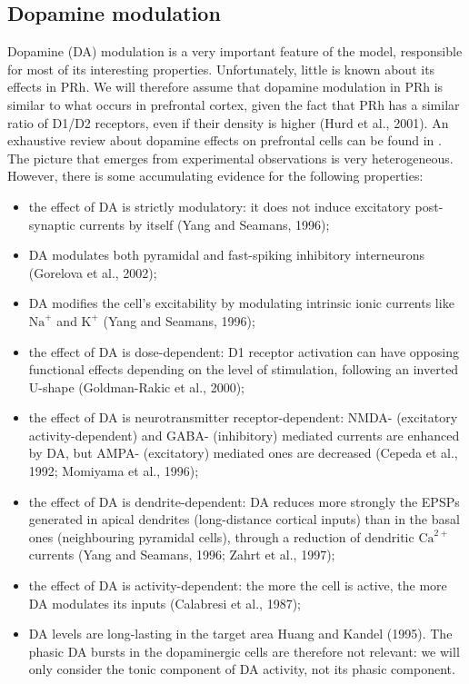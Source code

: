 \documentclass[
  11pt,
  a4paper,
]{scrbook}
\providecommand{\tightlist}{%
  \setlength{\itemsep}{0pt}\setlength{\parskip}{0pt}}\usepackage{longtable,booktabs,array}
\begin{document}
\subsection{Dopamine modulation}\label{dopamine-modulation}

Dopamine (DA) modulation is a very important feature of the model,
responsible for most of its interesting properties. Unfortunately,
little is known about its effects in PRh. We will therefore assume that
dopamine modulation in PRh is similar to what occurs in prefrontal
cortex, given the fact that PRh has a similar ratio of D1/D2 receptors,
even if their density is higher (Hurd et al., 2001). An exhaustive
review about dopamine effects on prefrontal cells can be found in . The
picture that emerges from experimental observations is very
heterogeneous. However, there is some accumulating evidence for the
following properties:

\begin{itemize}
\tightlist
\item
  the effect of DA is strictly modulatory: it does not induce excitatory
  post-synaptic currents by itself (Yang and Seamans, 1996);
\item
  DA modulates both pyramidal and fast-spiking inhibitory interneurons
  (Gorelova et al., 2002);
\item
  DA modifies the cell's excitability by modulating intrinsic ionic
  currents like \(\text{Na}^{+}\) and \(\text{K}^{+}\) (Yang and
  Seamans, 1996);
\item
  the effect of DA is dose-dependent: D1 receptor activation can have
  opposing functional effects depending on the level of stimulation,
  following an inverted U-shape (Goldman-Rakic et al., 2000);
\item
  the effect of DA is neurotransmitter receptor-dependent: NMDA-
  (excitatory activity-dependent) and GABA- (inhibitory) mediated
  currents are enhanced by DA, but AMPA- (excitatory) mediated ones are
  decreased (Cepeda et al., 1992; Momiyama et al., 1996);
\item
  the effect of DA is dendrite-dependent: DA reduces more strongly the
  EPSPs generated in apical dendrites (long-distance cortical inputs)
  than in the basal ones (neighbouring pyramidal cells), through a
  reduction of dendritic \(\text{Ca}^{2+}\) currents (Yang and Seamans,
  1996; Zahrt et al., 1997);
\item
  the effect of DA is activity-dependent: the more the cell is active,
  the more DA modulates its inputs (Calabresi et al., 1987);
\item
  DA levels are long-lasting in the target area Huang and Kandel (1995).
  The phasic DA bursts in the dopaminergic cells are therefore not
  relevant: we will only consider the tonic component of DA activity,
  not its phasic component.
\end{itemize}
\end{document}
